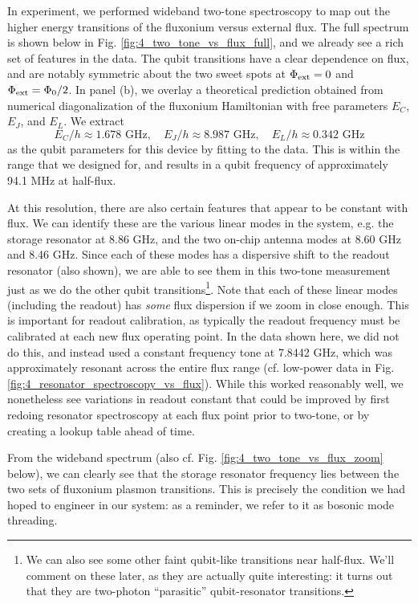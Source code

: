 In experiment, we performed wideband two-tone spectroscopy to map out the higher energy transitions of the fluxonium versus external flux. The full spectrum is shown below in Fig. \ref{fig:4_two_tone_vs_flux_full}, and we already see a rich set of features in the data. The qubit transitions have a clear dependence on flux, and are notably symmetric about the two sweet spots at $\Phi_{\rm ext} = 0$ and $\Phi_{\rm ext} = \Phi_0/2$. In panel (b), we overlay a theoretical prediction obtained from numerical diagonalization of the fluxonium Hamiltonian with free parameters $E_C$, $E_J$, and $E_L$. We extract
\begin{equation}
    E_C/h \approx 1.678 \,\, \text{GHz}, \quad  E_J/h \approx 8.987 \,\, \text{GHz}, \quad  E_L/h \approx 0.342 \,\, \text{GHz} 
    \label{eq:4_qubit_parameters_fit}
\end{equation}
as the qubit parameters for this device by fitting to the data. This is within the range that we designed for, and results in a qubit frequency of approximately 94.1 MHz at half-flux. 

At this resolution, there are also certain features that appear to be constant with flux. We can identify these are the various linear modes in the system, e.g. the storage resonator at 8.86 GHz, and the two on-chip antenna modes at 8.60 GHz and 8.46 GHz. Since each of these modes has a dispersive shift to the readout resonator (also shown), we are able to see them in this two-tone measurement just as we do the other qubit transitions\footnote{We can also see some other faint qubit-like transitions near half-flux. We'll comment on these later, as they are actually quite interesting: it turns out that they are two-photon ``parasitic'' qubit-resonator transitions.}. Note that each of these linear modes (including the readout) has \textit{some} flux dispersion if we zoom in close enough. This is important for readout calibration, as typically the readout frequency must be calibrated at each new flux operating point. In the data shown here, we did not do this, and instead used a constant frequency tone at 7.8442 GHz, which was approximately resonant across the entire flux range (cf. low-power data in Fig. \ref{fig:4_resonator_spectroscopy_vs_flux}). While this worked reasonably well, we nonetheless see variations in readout constant that could be improved by first redoing resonator spectroscopy at each flux point prior to two-tone, or by creating a lookup table ahead of time. 

From the wideband spectrum (also cf. Fig. \ref{fig:4_two_tone_vs_flux_zoom} below), we can clearly see that the storage resonator frequency lies between the two sets of fluxonium plasmon transitions. This is precisely the condition we had hoped to engineer in our system: as a reminder, we refer to it as bosonic mode threading. 

